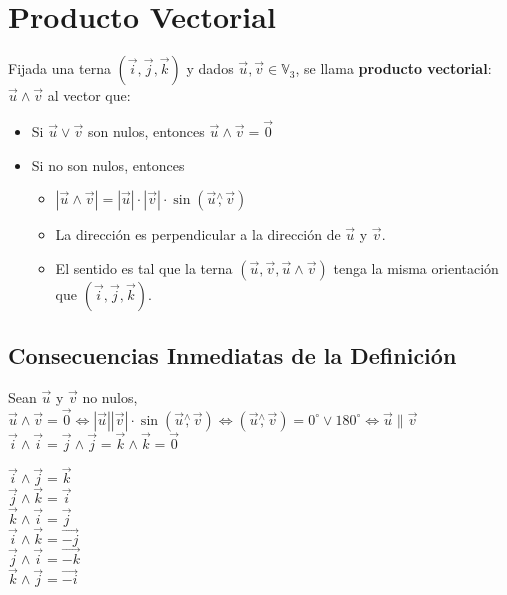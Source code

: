 \documentclass[11pt,a4paper]{article}
\begin{document}
\section{Producto Vectorial}
\noindent Fijada una terna $(\overrightarrow{i}, \overrightarrow{j}, \overrightarrow{k})$ y dados $\overrightarrow{u},\overrightarrow{v}\in\mathbb{V}_3$, se llama \textbf{producto vectorial}: $\overrightarrow{u} \wedge \overrightarrow{v}$ al vector que:
\begin{itemize}
\item Si $\overrightarrow{u} \lor \overrightarrow{v}$ son nulos, entonces $\overrightarrow{u}\wedge\overrightarrow{v} = \overrightarrow{0}$
\item Si no son nulos, entonces
\begin{itemize}
\item $|\overrightarrow{u}\wedge\overrightarrow{v}| = |\overrightarrow{u}|\cdot|\overrightarrow{v}|\cdot\sin(\overrightarrow{u}\overset{\wedge}{,}\overrightarrow{v})$
\item La direcci\'on es perpendicular a la direcci\'on de $\overrightarrow{u}$ y $\overrightarrow{v}$.
\item El sentido es tal que la terna $(\overrightarrow{u},\overrightarrow{v},\overrightarrow{u}\wedge\overrightarrow{v})$ tenga la misma orientaci\'on que $(\overrightarrow{i},\overrightarrow{j},\overrightarrow{k})$.
\end{itemize}
\end{itemize}

\subsection{Consecuencias Inmediatas de la Definici\'on}
\noindent Sean $\overrightarrow{u}$ y $\overrightarrow{v}$ no nulos, $\overrightarrow{u}\wedge\overrightarrow{v}=\overrightarrow{0} \iff |\overrightarrow{u}||\overrightarrow{v}|\cdot\sin (\overrightarrow{u}\overset{\wedge}{,}\overrightarrow{v}) \iff (\overrightarrow{u}\overset{\wedge}{,}\overrightarrow{v}) = 0^\circ \lor 180^\circ \iff \overrightarrow{u} \parallel \overrightarrow{v}$\\

\noindent $\overrightarrow{i} \wedge \overrightarrow{i} = \overrightarrow{j} \wedge \overrightarrow{j} = \overrightarrow{k} \wedge \overrightarrow{k} = \overrightarrow{0}$
\begin{multicols}{6}
\noindent $\overrightarrow{i} \wedge \overrightarrow{j} = \overrightarrow{k}$\\
$\overrightarrow{j} \wedge \overrightarrow{k} = \overrightarrow{i}$\\
$\overrightarrow{k} \wedge \overrightarrow{i} = \overrightarrow{j}$\\
$\overrightarrow{i} \wedge \overrightarrow{k} = \overrightarrow{-j}$\\
$\overrightarrow{j} \wedge \overrightarrow{i} = \overrightarrow{-k}$\\
$\overrightarrow{k} \wedge \overrightarrow{j} = \overrightarrow{-i}$
\end{multicols}
\end{document}
